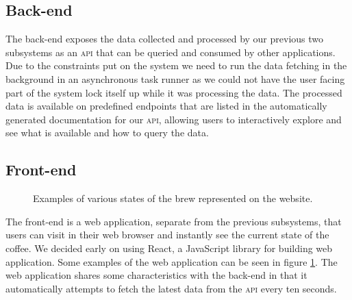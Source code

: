 \documentclass[12pt,a4paper,oneside,article]{memoir}
\numberwithin{equation}{chapter}
\begin{document}
\subsection{Back-end}\label{sec:back-end}
The back-end exposes the data collected and processed by our previous two
subsystems as an \textsc{api} that can be queried and consumed by other
applications. Due to the constraints put on the system we need to run the data
fetching in the background in an asynchronous task runner as we could not have
the user facing part of the system lock itself up while it was processing the
data. The processed data is available on predefined endpoints that are listed in
the automatically generated documentation for our \textsc{api}, allowing users
to interactively explore and see what is available and how to query the data.

\subsection{Front-end}\label{sec:front-end}
\begin{figure}[ht]
  \centerfloat{}
  \caption{Examples of various states of the brew represented on the website.}\label{fig:website}
\end{figure}
The front-end is a web application, separate from the previous subsystems, that
users can visit in their web browser and instantly see the current state of the
coffee. We decided early on using React, a JavaScript library for building web
application. Some examples of the web application can be seen in figure
\ref{fig:website}. The web application shares some characteristics with the
back-end in that it automatically attempts to fetch the latest data from the
\textsc{api} every ten seconds.
\end{document}
